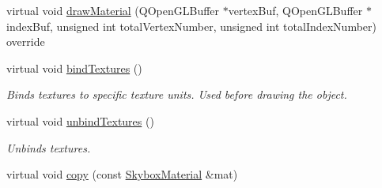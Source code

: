 \begin{DoxyCompactItemize}
\item 
virtual void \mbox{\hyperlink{class_geometry_engine_1_1_geometry_material_1_1_skybox_material_a0cc520b905996a178c80a2657bc9746f}{draw\+Material}} (Q\+Open\+G\+L\+Buffer $\ast$vertex\+Buf, Q\+Open\+G\+L\+Buffer $\ast$index\+Buf, unsigned int total\+Vertex\+Number, unsigned int total\+Index\+Number) override
\item 
\mbox{\label{class_geometry_engine_1_1_geometry_material_1_1_skybox_material_a04ca59e198af1cd358a2f876df876adb}} 
virtual void \mbox{\hyperlink{class_geometry_engine_1_1_geometry_material_1_1_skybox_material_a04ca59e198af1cd358a2f876df876adb}{bind\+Textures}} ()
\begin{DoxyCompactList}\small\item\em Binds textures to specific texture units. Used before drawing the object. \end{DoxyCompactList}\item 
\mbox{\label{class_geometry_engine_1_1_geometry_material_1_1_skybox_material_aad9f4a883662ee6586da08cf59e42105}} 
virtual void \mbox{\hyperlink{class_geometry_engine_1_1_geometry_material_1_1_skybox_material_aad9f4a883662ee6586da08cf59e42105}{unbind\+Textures}} ()
\begin{DoxyCompactList}\small\item\em Unbinds textures. \end{DoxyCompactList}\item 
virtual void \mbox{\hyperlink{class_geometry_engine_1_1_geometry_material_1_1_skybox_material_afcb8bf256fbb2927e2030fbe8a631af0}{copy}} (const \mbox{\hyperlink{class_geometry_engine_1_1_geometry_material_1_1_skybox_material}{Skybox\+Material}} \&mat)
\end{DoxyCompactItemize}
